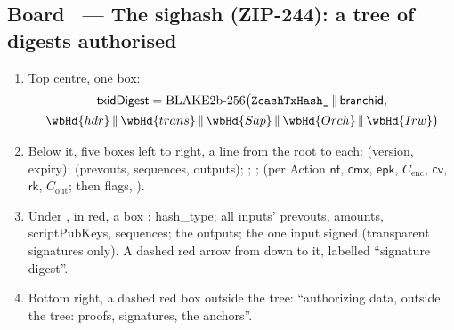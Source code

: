 \documentclass[11pt,a4paper]{article}
\makeatletter
\newcommand{\nfsym}{\ensuremath{\mathsf{nf}}}
\newcommand{\cmx}{\ensuremath{\mathsf{cmx}}}
\newcommand{\cvsym}{\ensuremath{\mathsf{cv}}}
\newcommand{\rksym}{\ensuremath{\mathsf{rk}}}
\newcommand{\epk}{\ensuremath{\mathsf{epk}}}
\newcounter{board}
\newenvironment{board}[2]{\stepcounter{board}%
  \subsection*{Board \theboard\ --- #1 \hfill {\normalfont\small\color{arb}#2}}}{\medskip}
\newcommand{\Draw}{\draw@head{Draw}}
\makeatother
\begin{document}
\begin{board}{The sighash (ZIP-244): a tree of digests}{authorised}
\Draw
\begin{enumerate}
  \item Top centre, one box:
    \begin{gather*}
      \mathsf{txidDigest} = \mathrm{BLAKE2b}\text{-}256\bigl(
        \texttt{ZcashTxHash\_}\,\|\,\mathsf{branchid},\\
        \wbHd{hdr}\,\|\,\wbHd{trans}\,\|\,\wbHd{Sap}\,\|\,
        \wbHd{Orch}\,\|\,\wbHd{Irw}\bigr)
    \end{gather*}
  \item Below it, five boxes left to right, a line from the root to each:
     (version, expiry);  (prevouts, sequences,
    outputs); ; ;  (per Action $\nfsym$,
    $\cmx$, $\epk$, $C_{\mathrm{enc}}$, $\cvsym$, $\rksym$,
    $C_{\mathrm{out}}$; then flags, \wbHvbi).
  \item Under , in red, a box : hash\_type;
    all inputs' prevouts, amounts, scriptPubKeys, sequences; the outputs;
    the one input signed (transparent signatures only). A dashed red
    arrow from  down to it, labelled ``signature digest''.
  \item Bottom right, a dashed red box outside the tree: ``authorizing
    data, outside the tree: proofs, signatures, the anchors''.
\end{enumerate}
\begin{center}
\end{center}
\end{board}
\end{document}
